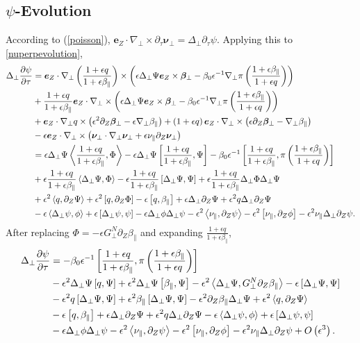 \documentclass{article}
\newcommand{\para}{\parallel}
\newcommand{\ep}{\epsilon}
\newcommand{\np}{\nabla_\perp}
\newcommand{\lap}{\Delta_\perp}
\newcommand{\p}{\partial}
\newcommand{\deriv}[2]{\frac{\p #1}{\p #2}}
\newcommand{\fr}{\frac{1+\ep q}{1+\ep\beta_\para}}
\newcommand{\frinv}{\frac{1+\ep\beta_\para}{1+\ep q}}
\newcommand{\GN}{G_\perp^N}
\newcommand{\pth} [1] {\left( #1 \right) }
\newcommand{\br} [1] {\left[ #1 \right] }
\begin{document}
\subsection{$\psi$-Evolution}
According to (\ref{poisson}), $\bm{e}_Z\cdot\np\times\p_\tau\bm{\nu}_\perp = \lap\p_\tau\psi$. Applying this to \eqref{nuperpevolution},
\begin{align*}
    \lap\deriv{\psi}{\tau} &= \bm{e}_Z\cdot\np\pth{\fr} \times\pth{\ep\lap\Psi\bm{e}_Z\times\bm{\beta}_\perp - \beta_0\ep^{-1}\np\pi\pth{\frinv}} \\
    &+ \fr\bm{e}_Z\cdot\np\times\pth{\ep\lap\Psi\bm{e}_Z\times\bm{\beta}_\perp - \beta_0\ep^{-1}\np\pi\pth{\frinv}} \\
    &+ \bm{e}_Z\cdot \np q \times \pth{\ep^2\p_Z\bm{\beta}_\perp - \ep\np\beta_\para} + \pth{1+\ep q} \bm{e}_Z\cdot \np\times \pth{\ep\p_Z\bm{\beta}_\perp - \np\beta_\para} \\
    &- \ep\bm{e}_Z\cdot\np\times\pth{\bm{\nu}_\perp\cdot\np\bm{\nu}_\perp + \ep\nu_\para\p_Z\bm{\nu}_\perp} \\
    &= \ep\lap\Psi\Braket{\fr, \Phi} - \ep\lap\Psi\br{\fr, \Psi} - \beta_0\ep^{-1}\br{\fr, \pi\pth{\frinv}} \\ 
    &+ \ep\fr\Braket{\lap\Psi, \Phi} - \ep\fr \br{\lap\Psi, \Psi} + \ep\fr\lap\Phi\lap\Psi \\
    &+ \ep^2\Braket{q, \p_Z\Psi} + \ep^2\br{q, \p_Z\Phi} -\ep\br{q, \beta_\para} + \ep\lap\p_Z\Psi + \ep^2q\lap\p_Z\Psi \\
    &- \ep\Braket{\lap\psi, \phi} + \ep\br{\lap\psi, \psi} - \ep\lap\phi\lap\psi - \ep^2\Braket{\nu_\para, \p_Z\psi} - \ep^2\br{\nu_\para, \p_Z\phi} - \ep^2\nu_\para\lap\p_Z\psi.
\end{align*}
After replacing $\Phi=-\ep\GN\p_Z\beta_\para$ and expanding $\fr$, 
\begin{align*}
    \lap\deriv{\psi}{\tau} &= - \beta_0\ep^{-1} \br{\fr, \pi\pth{\frinv}} \\
    &- \ep^2\lap\Psi\br{q,\Psi} + \ep^2\lap\Psi\br{\beta_\para,\Psi} - \ep^2\Braket{\lap\Psi, \GN\p_Z\beta_\para} - \ep\br{\lap\Psi, \Psi} \\
    &- \ep^2q\br{\lap\Psi, \Psi} + \ep^2\beta_\para\br{\lap\Psi, \Psi} - \ep^2\p_Z\beta_\para\lap\Psi + \ep^2\Braket{q, \p_Z\Psi} \\
    &- \ep\br{q, \beta_\para} + \ep\lap\p_Z\Psi +\ep^2q\lap\p_Z\Psi - \ep\Braket{\lap\psi, \phi} + \ep\br{\lap\psi, \psi} \\
    &- \ep\lap\phi\lap\psi - \ep^2\Braket{\nu_\para, \p_Z\psi} -\ep^2\br{\nu_\para, \p_Z\phi} - \ep^2\nu_\para\lap\p_Z\psi + O\pth{\ep^3}.
\end{align*}
\end{document}
